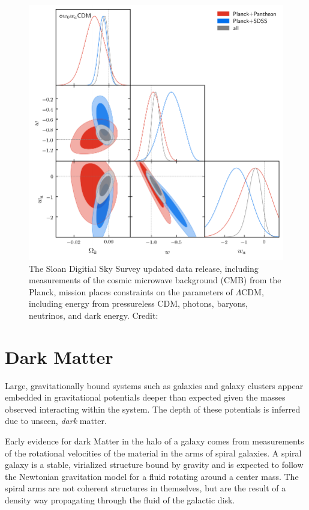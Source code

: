 \documentclass{paper}
\begin{document}
  \begin{figure}[H]
    \begin{centering}
    \includegraphics[scale=0.7]{Intro-constraints.pdf}
    \caption{The Sloan Digitial Sky Survey updated data release, including 
      measurements of the cosmic microwave background (CMB) from the Planck,
      mission places constraints on the parameters of $\Lambda$CDM, including
      energy from pressureless CDM, photons, baryons, neutrinos, and dark
      energy.
    Credit: \cite{2021PhRvD.103h3533A}}
    \label{fig:Intro-constraints}
    \end{centering}
  \end{figure}

\section*{Dark Matter}
  Large, gravitationally bound systems such as galaxies and galaxy clusters 
  appear embedded in gravitational potentials deeper than expected given 
  the masses observed interacting within the system. The depth of these 
  potentials is inferred due to unseen, \textit{dark} matter.

  Early evidence for dark Matter in the halo of a galaxy comes from
  measurements of the rotational velocities of the material in the arms of
  spiral galaxies. A spiral galaxy is a stable, virialized structure bound by
  gravity and is expected to follow the Newtonian gravitation model for a
  fluid rotating around a center mass. The spiral arms are not coherent
  structures in themselves, but are the result of a density way propagating 
  through the fluid of the galactic disk. 
\end{document}
